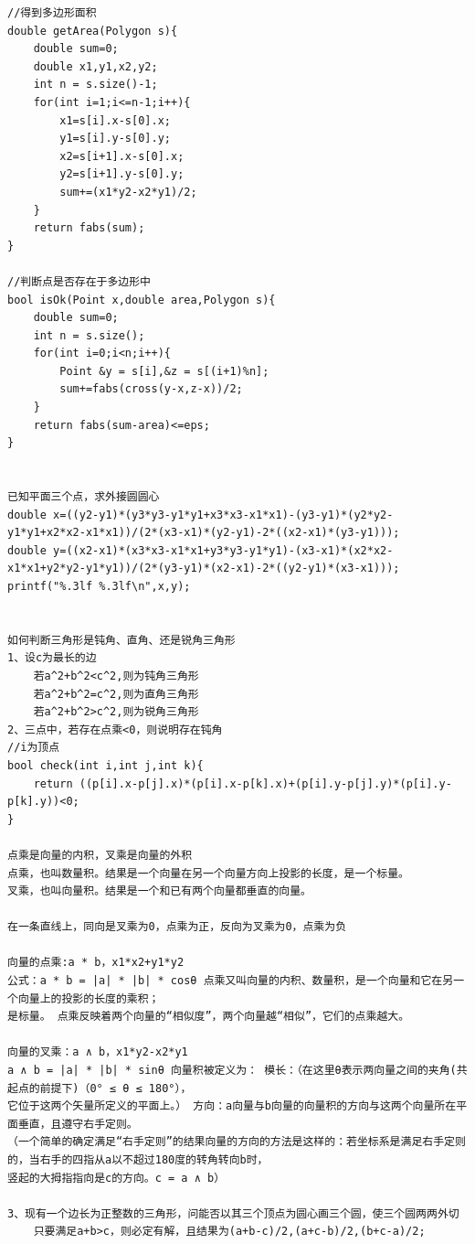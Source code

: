 \documentclass[twoside]{article}
\begin{document}
\begin{lstlisting}
//得到多边形面积
double getArea(Polygon s){
    double sum=0;
    double x1,y1,x2,y2;
    int n = s.size()-1;
    for(int i=1;i<=n-1;i++){
        x1=s[i].x-s[0].x;
        y1=s[i].y-s[0].y;
        x2=s[i+1].x-s[0].x;
        y2=s[i+1].y-s[0].y;
        sum+=(x1*y2-x2*y1)/2;
    }
    return fabs(sum);
}

//判断点是否存在于多边形中
bool isOk(Point x,double area,Polygon s){
    double sum=0;
    int n = s.size();
    for(int i=0;i<n;i++){
        Point &y = s[i],&z = s[(i+1)%n];
        sum+=fabs(cross(y-x,z-x))/2;
    }
    return fabs(sum-area)<=eps;
}


已知平面三个点，求外接圆圆心
double x=((y2-y1)*(y3*y3-y1*y1+x3*x3-x1*x1)-(y3-y1)*(y2*y2-y1*y1+x2*x2-x1*x1))/(2*(x3-x1)*(y2-y1)-2*((x2-x1)*(y3-y1)));
double y=((x2-x1)*(x3*x3-x1*x1+y3*y3-y1*y1)-(x3-x1)*(x2*x2-x1*x1+y2*y2-y1*y1))/(2*(y3-y1)*(x2-x1)-2*((y2-y1)*(x3-x1)));
printf("%.3lf %.3lf\n",x,y);


如何判断三角形是钝角、直角、还是锐角三角形
1、设c为最长的边
    若a^2+b^2<c^2,则为钝角三角形
    若a^2+b^2=c^2,则为直角三角形
    若a^2+b^2>c^2,则为锐角三角形
2、三点中，若存在点乘<0，则说明存在钝角
//i为顶点
bool check(int i,int j,int k){
    return ((p[i].x-p[j].x)*(p[i].x-p[k].x)+(p[i].y-p[j].y)*(p[i].y-p[k].y))<0;
}

点乘是向量的内积，叉乘是向量的外积
点乘，也叫数量积。结果是一个向量在另一个向量方向上投影的长度，是一个标量。
叉乘，也叫向量积。结果是一个和已有两个向量都垂直的向量。

在一条直线上，同向是叉乘为0，点乘为正，反向为叉乘为0，点乘为负

向量的点乘:a * b，x1*x2+y1*y2
公式：a * b = |a| * |b| * cosθ 点乘又叫向量的内积、数量积，是一个向量和它在另一个向量上的投影的长度的乘积；
是标量。 点乘反映着两个向量的“相似度”，两个向量越“相似”，它们的点乘越大。

向量的叉乘：a ∧ b，x1*y2-x2*y1
a ∧ b = |a| * |b| * sinθ 向量积被定义为： 模长：（在这里θ表示两向量之间的夹角(共起点的前提下)（0° ≤ θ ≤ 180°），
它位于这两个矢量所定义的平面上。） 方向：a向量与b向量的向量积的方向与这两个向量所在平面垂直，且遵守右手定则。
（一个简单的确定满足“右手定则”的结果向量的方向的方法是这样的：若坐标系是满足右手定则的，当右手的四指从a以不超过180度的转角转向b时，
竖起的大拇指指向是c的方向。c = a ∧ b）

3、现有一个边长为正整数的三角形，问能否以其三个顶点为圆心画三个圆，使三个圆两两外切
    只要满足a+b>c，则必定有解，且结果为(a+b-c)/2,(a+c-b)/2,(b+c-a)/2;













\end{lstlisting}
\end{document}
